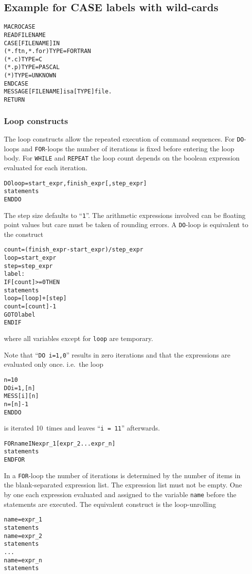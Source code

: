 \subsection*{Example for CASE labels with wild-cards}
\begin{alltt}
   MACRO CASE
      READ FILENAME
      CASE [FILENAME] IN
      (*.ftn, *.for)  TYPE = FORTRAN
      (*.c)           TYPE = C
      (*.p)           TYPE = PASCAL
      (*)             TYPE = UNKNOWN
      ENDCASE
      MESSAGE [FILENAME] is a [TYPE] file.
   RETURN
\end{alltt}

\subsubsection{Loop constructs}

The loop constructs allow the repeated execution of command sequences.
For \texttt{DO}-loops and \texttt{FOR}-loops the number of iterations
is fixed before entering the loop body.
For \texttt{WHILE} and \texttt{REPEAT} the loop count depends on the boolean
expression evaluated for each iteration.


\label{ref:DO}

\begin{alltt}
DO loop = start_expr, finish_expr  [, step_expr ]
   statements
ENDDO
\end{alltt}
The step size defaults to ``\texttt{1}''.
The arithmetic expressions involved can be floating point values but
care must be taken of rounding errors.
A \texttt{DO}-loop is equivalent to the construct
\begin{alltt}
count = ( finish_expr - start_expr ) / step_expr
loop = start_expr
step = step_expr
label:
IF [count] >= 0 THEN
   statements
   loop = [loop] + [step]
   count = [count] - 1
   GOTO label
ENDIF
\end{alltt}
where all variables except for \texttt{loop} are temporary.

Note that ``\texttt{DO i=1,0}'' results in zero iterations and that the
expressions are evaluated only once. i.e.\ the loop
\begin{alltt}
n = 10
DO i=1,[n]
   MESS [i] [n]
   n = [n] - 1
ENDDO
\end{alltt}
is iterated 10~times and leaves ``\texttt{i = 11}'' afterwards.

\begin{alltt}
FOR name IN expr_1 [ expr_2 ... expr_n ]
   statements
ENDFOR
\end{alltt}
\label{ref:FOR}
In a \texttt{FOR}-loop the number of iterations is determined by the
number of items in the blank-separated expression list.
The expression list must not be empty.
One by one each expression evaluated and assigned to
the variable \texttt{name} before the statements are executed.
The equivalent construct is the loop-unrolling
\begin{alltt}
name = expr_1
statements
name = expr_2
statements
...
name = expr_n
statements
\end{alltt}

